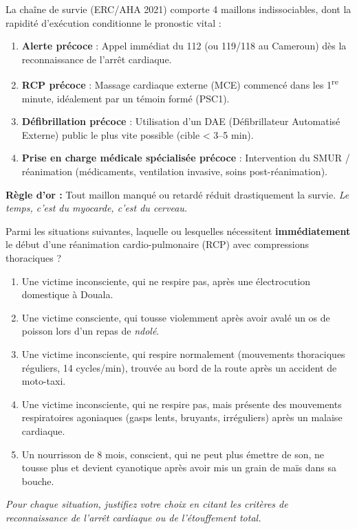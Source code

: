\documentclass[11pt]{article}
\newcommand{\cle}[1]{{\popxbold\color{popdark}#1}}
\begin{document}
\begin{aretenir}
La \cle{chaîne de survie} (ERC/AHA 2021) comporte 4 maillons indissociables, dont la rapidité d'exécution conditionne le pronostic vital :
\begin{enumerate}
    \item \textbf{Alerte précoce} : Appel immédiat du 112 (ou 119/118 au Cameroun) dès la reconnaissance de l'arrêt cardiaque.
    \item \textbf{RCP précoce} : Massage cardiaque externe (MCE) commencé dans les 1\textsuperscript{re} minute, idéalement par un témoin formé (PSC1).
    \item \textbf{Défibrillation précoce} : Utilisation d'un DAE (Défibrillateur Automatisé Externe) public le plus vite possible (cible < 3--5 min).
    \item \textbf{Prise en charge médicale spécialisée précoce} : Intervention du SMUR / réanimation (médicaments, ventilation invasive, soins post-réanimation).
\end{enumerate}
\textbf{Règle d'or :} Tout maillon manqué ou retardé réduit drastiquement la survie. \emph{Le temps, c'est du myocarde, c'est du cerveau.}
\end{aretenir}

\begin{exercice}
Parmi les situations suivantes, laquelle ou lesquelles nécessitent \textbf{immédiatement} le début d'une réanimation cardio-pulmonaire (RCP) avec compressions thoraciques ?
\begin{enumerate}
    \item Une victime inconsciente, qui ne respire pas, après une électrocution domestique à Douala.
    \item Une victime consciente, qui tousse violemment après avoir avalé un os de poisson lors d'un repas de \emph{ndolé}.
    \item Une victime inconsciente, qui respire normalement (mouvements thoraciques réguliers, 14 cycles/min), trouvée au bord de la route après un accident de moto-taxi.
    \item Une victime inconsciente, qui ne respire pas, mais présente des mouvements respiratoires agoniaques (gasps lents, bruyants, irréguliers) après un malaise cardiaque.
    \item Un nourrisson de 8 mois, conscient, qui ne peut plus émettre de son, ne tousse plus et devient cyanotique après avoir mis un grain de maïs dans sa bouche.
\end{enumerate}
\emph{Pour chaque situation, justifiez votre choix en citant les critères de reconnaissance de l'arrêt cardiaque ou de l'étouffement total.}
\end{exercice}
\end{document}
